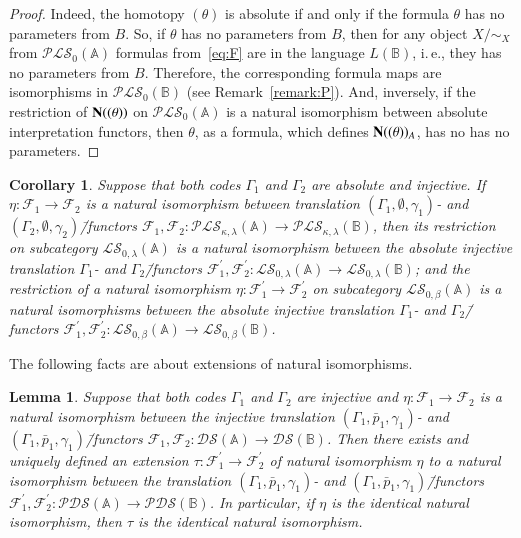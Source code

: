 \documentclass[12pt]{article}
\newtheorem{lemma}{Lemma}
\newtheorem{corollary}{Corollary}
\theoremstyle{definition}
\def\MA{{\mathbb{A}}}
\def\MB{{\mathbb{B}}}
\def\F{{\mathcal{F}}}
\def\PLS{{\mathcal{PLS}}}
\def\PDS{{\mathcal{PDS}}}
\def\DS{{\mathcal{DS}}}
\def\LS{{\mathcal{LS}}}
\begin{document}
\begin{proof}
Indeed, the homotopy $(\theta)$ is absolute if and only if the formula $\theta$ has no parameters from $B$. So, if $\theta$ has no parameters from $B$, then for any object $X/{\sim_X}$ from $\PLS_0(\MA)$ formulas from~\eqref{eq:F} are in the language $L(\MB)$, i.\,e., they has no parameters from $B$. Therefore, the corresponding formula maps are isomorphisms in $\PLS_0(\MB)$ (see Remark~\ref{remark:P}). And, inversely, if the restriction of ${\bf N}((\theta))$ on $\PLS_0(\MA)$ is a natural isomorphism between absolute interpretation functors, then $\theta$, as a formula, which defines ${\bf N}((\theta))_A$, has no   has no parameters.
\end{proof}

\begin{corollary}\label{cor:inj_abs}
Suppose that both codes $\Gamma_1$ and $\Gamma_2$ are absolute and injective. If $\eta\colon \F_1\to\F_2$ is a natural isomorphism between translation $(\Gamma_1,\emptyset,\gamma_1)$- and $(\Gamma_2,\emptyset,\gamma_2)$\=/functors $\F_1,\F_2\colon\PLS_{\kappa,\lambda}(\MA)\to\PLS_{\kappa,\lambda}(\MB)$, then its restriction on subcategory $\LS_{0,\lambda}(\MA)$ is a natural isomorphism between the absolute injective translation $\Gamma_1$- and $\Gamma_2$\=/functors $\F^\prime_1,\F^\prime_2\colon\LS_{0,\lambda}(\MA)\to\LS_{0,\lambda}(\MB)$;  and the restriction of a natural isomorphism $\eta\colon \F^\prime_1\to \F^\prime_2$ on subcategory $\LS_{0,\beta}(\MA)$ is a natural isomorphisms between the absolute injective translation $\Gamma_1$- and $\Gamma_2$\=/functors $\F^\prime_1,\F^\prime_2\colon\LS_{0,\beta}(\MA)\to\LS_{0,\beta}(\MB)$. 
\end{corollary}

The following facts are about extensions of natural isomorphisms.

\begin{lemma}\label{cor:natur_iso1}
Suppose that both codes $\Gamma_1$ and $\Gamma_2$ are injective and $\eta\colon \F_1\to\F_2$ is a natural isomorphism between the injective translation $(\Gamma_1,\bar p_1,\gamma_1)$- and $(\Gamma_1,\bar p_1,\gamma_1)$\=/functors $\F_1,\F_2\colon\DS(\MA)\to\DS(\MB)$. Then there exists and uniquely defined an extension $\tau\colon \F_1^\prime\to \F_2^\prime$ of natural isomorphism $\eta$ to a natural isomorphism between the translation $(\Gamma_1,\bar p_1,\gamma_1)$- and $(\Gamma_1,\bar p_1,\gamma_1)$\=/functors $\F_1^\prime,\F_2^\prime\colon\PDS(\MA)\to\PDS(\MB)$. In particular, if $\eta$ is the identical natural isomorphism, then $\tau$ is the identical natural isomorphism.
\end{lemma}
\end{document}
